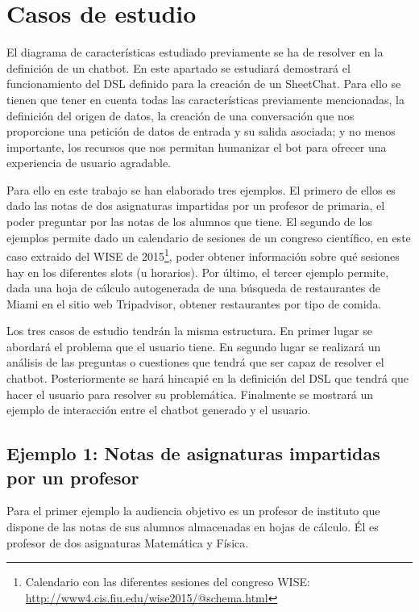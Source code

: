 \chapter{Casos de estudio}
\label{cha:CaseStudies}

El diagrama de características estudiado previamente se ha de resolver en la definición de un chatbot. En este apartado se estudiará demostrará el funcionamiento del DSL definido para la creación de un SheetChat. Para ello se tienen que tener en cuenta todas las características previamente mencionadas, la definición del origen de datos, la creación de una conversación que nos proporcione una petición de datos de entrada y su salida asociada; y no menos importante, los recursos que nos permitan humanizar el bot para ofrecer una experiencia de usuario agradable.

Para ello en este trabajo se han elaborado tres ejemplos. El primero de ellos es dado las notas de dos asignaturas impartidas por un profesor de primaria, el poder preguntar por las notas de los alumnos que tiene. El segundo de los ejemplos permite dado un calendario de sesiones de un congreso científico, en este caso extraido del WISE de 2015\footnote{Calendario con las diferentes sesiones del congreso WISE: \url{http://www4.cis.fiu.edu/wise2015/@schema.html}}, poder obtener información sobre qué sesiones hay en los diferentes slots (u horarios). Por último, el tercer ejemplo permite, dada una hoja de cálculo autogenerada de una búsqueda de restaurantes de Miami en el sitio web Tripadvisor, obtener restaurantes por tipo de comida.

Los tres casos de estudio tendrán la misma estructura. En primer lugar se abordará el problema que el usuario tiene. En segundo lugar se realizará un análisis de las preguntas o cuestiones que tendrá que ser capaz de resolver el chatbot. Posteriormente se hará hincapié en la definición del DSL que tendrá que hacer el usuario para resolver su problemática. Finalmente se mostrará un ejemplo de interacción entre el chatbot generado y el usuario.

\section{Ejemplo 1: Notas de asignaturas impartidas por un profesor}

Para el primer ejemplo la audiencia objetivo es un profesor de instituto que dispone de las notas de sus alumnos almacenadas en hojas de cálculo. Él es profesor de dos asignaturas Matemática y Física.

